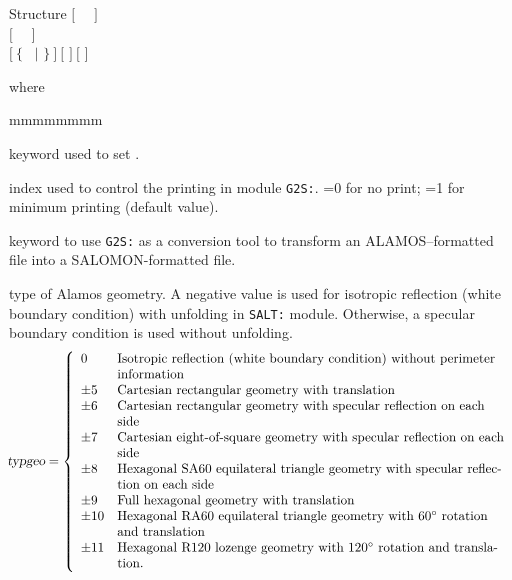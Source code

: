 \vskip -0.5cm

\begin{DataStructure}{Structure }
$[$~ ~$]$ \\
$[$~ ~$]$ \\
$[~\{$~ $|$  $\}~]~[$    $]~[$    $]$ \\
\moc{;}
\end{DataStructure}

\vskip -0.3cm

\noindent where
\begin{ListeDeDescription}{mmmmmmmm}

\item[\moc{EDIT}] keyword used to set .

\item[\dusa{iprint}] index used to control the printing in module {\tt G2S:}. =0 for no print; =1 for minimum printing (default value).

\item[\moc{ALAMOS}] keyword to use {\tt G2S:} as a conversion tool to transform an ALAMOS--formatted file into
a SALOMON-formatted file.

\item[\dusa{typgeo}] type of Alamos geometry. A negative value is used for isotropic reflection (white boundary condition) with unfolding in {\tt SALT:} module.
Otherwise, a specular boundary condition is used without unfolding.
\begin{displaymath}
\negthinspace \textsl{typgeo} = \left\{
\begin{array}{ll}
0 & \textrm{Isotropic reflection (white boundary condition) without perimeter}\\
& \textrm{information}\\
\pm 5 & \textrm{Cartesian rectangular geometry with translation}\\
\pm 6 & \textrm{Cartesian rectangular geometry with specular reflection on each}\\
& \textrm{side}\\
\pm 7 & \textrm{Cartesian eight-of-square geometry with specular reflection on each}\\
& \textrm{side}\\
\pm 8 & \textrm{Hexagonal SA60 equilateral triangle geometry with specular reflec-}\\
& \textrm{tion on each side}\\
\pm 9 & \textrm{Full hexagonal geometry with translation}\\
\pm 10 & \textrm{Hexagonal RA60 equilateral triangle geometry with } 60^\circ \textrm{ rotation}\\
& \textrm{and translation}\\
\pm 11 & \textrm{Hexagonal R120 lozenge geometry with } 120^\circ \textrm{ rotation and transla-}\\
& \textrm{tion.}
\end{array} \right.
\end{displaymath}


\end{ListeDeDescription}
